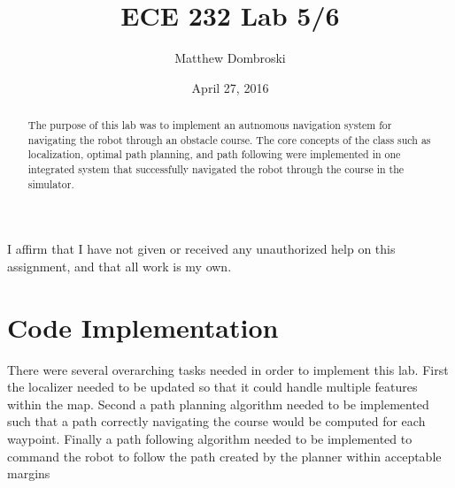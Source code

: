 \documentclass[letterpaper,12pt]{article}
\begin{document}
\title{ECE 232 Lab 5/6}
\author{Matthew Dombroski}
\date{April 27, 2016}
\maketitle


 I affirm that I have not given or received any unauthorized help on this assignment,
and that all work is my own.
\begin{abstract}
The purpose of this lab was to implement an autnomous navigation system for navigating the robot through an obstacle course. The core concepts of the class such as localization, optimal path planning, and path following were implemented in one integrated system that successfully navigated the robot through the course in the simulator. 
\end{abstract}


\section{Code Implementation}
There were several overarching tasks needed in order to implement this lab. First the localizer needed to be updated so that it could handle multiple features within the map. Second a path planning algorithm needed to be implemented such that a path correctly navigating the course would be computed for each waypoint. Finally a path following algorithm needed to be implemented to command the robot to follow the path created by the planner within acceptable margins
\end{document}
